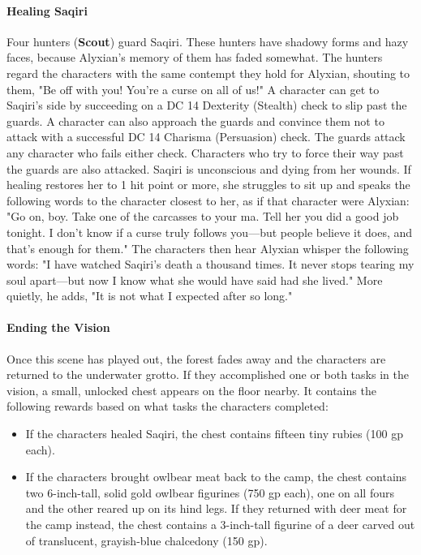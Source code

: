 \documentclass[10pt,a4,twoside,twocolumn,openany,nodeprecatedcode]{dndbook}
\begin{document}
\paragraph{Healing Saqiri}
Four hunters (\textbf{Scout}) guard Saqiri. These hunters have shadowy forms and hazy faces, because Alyxian's memory of them has faded somewhat.
The hunters regard the characters with the same contempt they hold for Alyxian, shouting to them, "Be off with you! You're a curse on all of us!" A character can get to Saqiri's side by succeeding on a DC 14 Dexterity (Stealth) check to slip past the guards. A character can also approach the guards and convince them not to attack with a successful DC 14 Charisma (Persuasion) check. The guards attack any character who fails either check. Characters who try to force their way past the guards are also attacked.
Saqiri is unconscious and dying from her wounds. If healing restores her to 1 hit point or more, she struggles to sit up and speaks the following words to the character closest to her, as if that character were Alyxian: "Go on, boy. Take one of the carcasses to your ma. Tell her you did a good job tonight. I don't know if a curse truly follows you—but people believe it does, and that's enough for them." The characters then hear Alyxian whisper the following words: "I have watched Saqiri's death a thousand times. It never stops tearing my soul apart—but now I know what she would have said had she lived." More quietly, he adds, "It is not what I expected after so long."
\paragraph{Ending the Vision}
Once this scene has played out, the forest fades away and the characters are returned to the underwater grotto. If they accomplished one or both tasks in the vision, a small, unlocked chest appears on the floor nearby. It contains the following rewards based on what tasks the characters completed:
\begin{itemize}

\item If the characters healed Saqiri, the chest contains fifteen tiny rubies (100 gp each).
\item If the characters brought owlbear meat back to the camp, the chest contains two 6-inch-tall, solid gold owlbear figurines (750 gp each), one on all fours and the other reared up on its hind legs. If they returned with deer meat for the camp instead, the chest contains a 3-inch-tall figurine of a deer carved out of translucent, grayish-blue chalcedony (150 gp).
\end{itemize}
\end{document}

